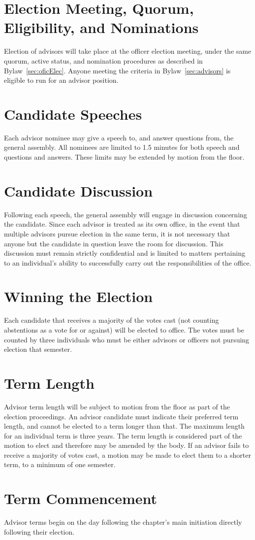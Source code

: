 \section{Election Meeting, Quorum,  Eligibility, and Nominations} Election of advisors will take place at the officer election meeting, under the same quorum,  active status, and nomination procedures  as described in Bylaw~\ref{sec:oficElec}. Anyone meeting the criteria in Bylaw~\ref{sec:advisors} is eligible to run for an advisor position.
\section{Candidate Speeches} Each advisor nominee may give a speech to, and answer questions from, the general assembly. All nominees are limited to 1.5 minutes for both speech and questions and answers. These limits may be extended by motion from the floor.
\section{Candidate Discussion} Following each speech, the general assembly will engage in discussion concerning the candidate. Since each advisor is treated as its own office, in the event that multiple advisors pursue election in the same term, it is not necessary that anyone but the candidate in question leave the room for discussion. This discussion must remain strictly confidential and is limited to matters pertaining to an individual's ability to successfully carry out the responsibilities of the office. 
\section{Winning the Election} Each candidate that receives a majority of the votes cast (not counting abstentions as a vote for or against) will be elected to office. The votes must be counted by three individuals who must be either advisors or officers not pursuing election that semester.
\section{Term Length} \label{sec:advisorLength} Advisor term length will be subject to motion from the floor as part of the election proceedings. An advisor candidate must indicate their preferred term length, and cannot be elected to a term longer than that. The maximum length for an individual term is three years. The term length is considered part of the motion to elect and therefore may be amended by the body. If an advisor fails to receive a majority of votes cast, a motion may be made to elect them to a shorter term, to a minimum of one semester.
\section{Term Commencement} Advisor terms begin on the day following the chapter's main initiation directly following their election.